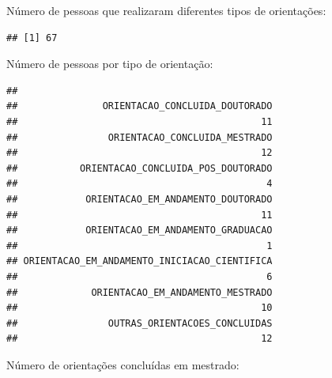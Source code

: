 \documentclass[]{article}
\newenvironment{Shaded}{\begin{snugshade}}{\end{snugshade}}
\newcommand{\ControlFlowTok}[1]{\textcolor[rgb]{0.13,0.29,0.53}{\textbf{#1}}}
\newcommand{\KeywordTok}[1]{\textcolor[rgb]{0.13,0.29,0.53}{\textbf{#1}}}
\newcommand{\NormalTok}[1]{#1}
\newcommand{\OperatorTok}[1]{\textcolor[rgb]{0.81,0.36,0.00}{\textbf{#1}}}
\begin{document}
Número de pessoas que realizaram diferentes tipos de orientações:

\begin{Shaded}
\end{Shaded}

\begin{verbatim}
## [1] 67
\end{verbatim}

Número de pessoas por tipo de orientação:

\begin{Shaded}
\end{Shaded}

\begin{verbatim}
## 
##               ORIENTACAO_CONCLUIDA_DOUTORADO 
##                                           11 
##                ORIENTACAO_CONCLUIDA_MESTRADO 
##                                           12 
##           ORIENTACAO_CONCLUIDA_POS_DOUTORADO 
##                                            4 
##            ORIENTACAO_EM_ANDAMENTO_DOUTORADO 
##                                           11 
##            ORIENTACAO_EM_ANDAMENTO_GRADUACAO 
##                                            1 
## ORIENTACAO_EM_ANDAMENTO_INICIACAO_CIENTIFICA 
##                                            6 
##             ORIENTACAO_EM_ANDAMENTO_MESTRADO 
##                                           10 
##                OUTRAS_ORIENTACOES_CONCLUIDAS 
##                                           12
\end{verbatim}

Número de orientações concluídas em mestrado:

\begin{Shaded}
\end{Shaded}
\end{document}
